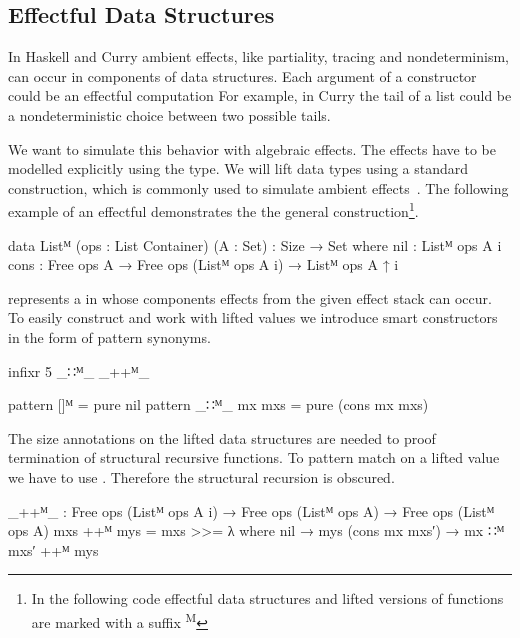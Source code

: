 \subsection{Effectful Data Structures}

In Haskell and Curry ambient effects, like partiality, tracing and
nondeterminism, can occur in components of data structures.
Each argument of a constructor could be an effectful computation
For example, in Curry the tail of a list could be a nondeterministic choice
between two possible tails.

We want to simulate this behavior with algebraic effects.
The effects have to be modelled explicitly using the  type.
We will lift data types using a standard construction, which is commonly used
to simulate ambient
effects~\cite{DBLP:conf/haskell/AbelBBHN05,DBLP:journals/programming/DylusCT19,DBLP:conf/haskell/ChristiansenDB19}.
The following example of an effectful  demonstrates the
the general construction\footnote{In the following code effectful data
  structures and lifted versions of functions are marked with a suffix
  \textsuperscript{M}}.

\begin{code}
data Listᴹ (ops : List Container) (A : Set) : {Size} → Set where
  nil   : Listᴹ ops A {i}
  cons  : Free ops A → Free ops (Listᴹ ops A {i}) → Listᴹ ops A {↑ i}
\end{code}
\AgdaSpace{}\AgdaSpace{}
represents a \AgdaSpace{} in whose components
effects from the given effect stack  can occur.
To easily construct and work with lifted values we introduce smart constructors
in the form of pattern synonyms.

\begin{code}[hide]
infixr 5 _∷ᴹ_ _++ᴹ_
\end{code}
\begin{code}
pattern []ᴹ          = pure nil
pattern _∷ᴹ_ mx mxs  = pure (cons mx mxs)
\end{code}
The size annotations on the lifted data structures are needed to proof
termination of structural recursive functions.
To pattern match on a lifted value we have to use \AgdaFunction{>>=}.
Therefore the structural recursion is obscured.

\begin{code}
_++ᴹ_ : Free ops (Listᴹ ops A {i}) → Free ops (Listᴹ ops A) → Free ops (Listᴹ ops A)
mxs ++ᴹ mys = mxs >>= λ where
  nil             → mys
  (cons mx mxs′)  → mx ∷ᴹ mxs′ ++ᴹ mys
\end{code}

